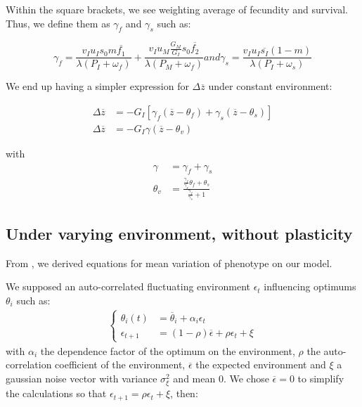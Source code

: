 Within the square brackets, we see weighting average of fecundity and survival. Thus, we define them as $\gamma_{f}$ and $\gamma_{s}$ such as:

\begin{subequations}
	\begin{equation}
	\label{eq:gammaf}
	\gamma_{f} = \frac{v_{I} u_{I} s_{0} m \overline{f_{1}} }{\lambda(P_{I}+\omega_{f})} + \frac{ v_{I} u_{M} \frac{G_{M}}{G_{I}} s_{0} \overline{f_{2}}}{\lambda ( P_{M} + \omega_{f} )}
	\end{equation}
	and
	\begin{equation}
	\label{eq:gammas}
	\gamma_{s} = \frac{ v_{I} u_{I} \overline{s_{I}} (1-m) }{\lambda(P_{I}+\omega_{s})}
	\end{equation}
\end{subequations}

We end up having a simpler expression for $\Delta\overline{z}$ under constant environment:

\begin{align}
	\Delta\overline{z} &= -G_{I} \left[ \gamma_{f}(\overline{z} - \theta_{f}) + \gamma_{s}(\overline{z} - \theta_{s}) \right] \nonumber \\
	\Delta\overline{z} &= - G_{I} \gamma(\overline{z} - \theta_{v})
\end{align}

with
\begin{align}
	\label{eq:gamma}
	\gamma &= \gamma_{f} + \gamma_{s} \\
	\label{eq:thetav}
	\theta_{v} &= \frac{\frac{\gamma_{f}}{\gamma_{s}}\theta_{f} + \theta_{s}}{\frac{\gamma_{f}}{\gamma_{s}} + 1}
\end{align}

\subsection*{Under varying environment, without plasticity}
From \citet{engen_evolution_2011}, we derived equations for mean variation of phenotype on our model.

We supposed an auto-correlated fluctuating environment $\epsilon_{t}$ influencing optimums $\theta_{i}$ such as:
\begin{align}
	\label{eq:epstheta}
\left\{
	\begin{aligned}
		\theta_{i}(t) &= \overline{\theta}_{i} + \alpha_{i}\epsilon_{t}\\
		\epsilon_{t+1} &= (1-\rho)\overline{\epsilon} + \rho\epsilon_{t} + \xi
	\end{aligned}
\right.
\end{align}
with $\alpha_{i}$ the dependence factor of the optimum on the environment, $\rho$ the auto-correlation coefficient of the environment, $\overline{\epsilon}$ the expected environment and $\xi$ a gaussian noise vector with variance $\sigma^{2}_{\xi}$ and mean $0$. We chose $\overline{\epsilon}=0$ to simplify the calculations so that $\epsilon_{t+1} = \rho\epsilon_{t} + \xi$, then:

